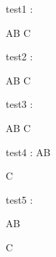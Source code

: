 \documentclass[a4paper,oneside,11pt]{book}
\begin{document}
%
test1 : 

AB%
C

test2 : 
%

AB
C

test3 : 
%
%

AB
%
C

test4 : AB

C
%
%

test5 : 
%
%

AB


C
\end{document}
